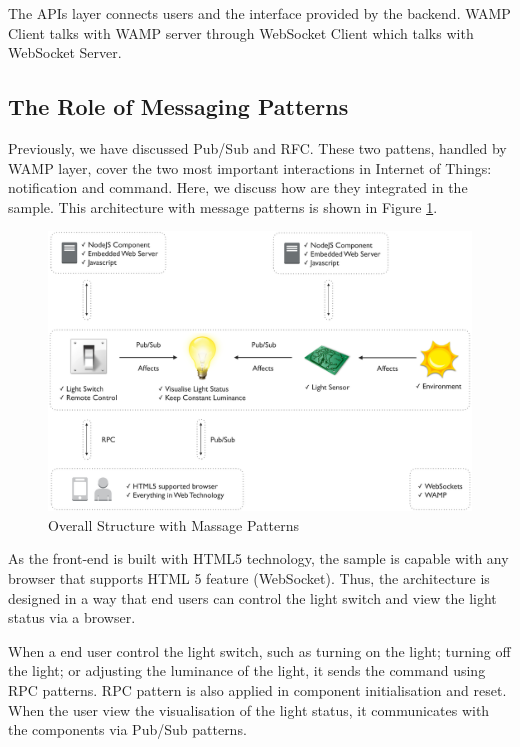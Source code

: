 The APIs layer connects users and the interface provided by the backend. WAMP Client talks with WAMP server through WebSocket Client which talks with WebSocket Server.

\subsection{The Role of Messaging Patterns}
Previously, we have discussed Pub/Sub and RFC. These two pattens, handled by WAMP layer, cover the two most important interactions in Internet of Things: notification and command. Here, we discuss how are they integrated in the sample. This architecture with message patterns is shown in Figure \ref{fig:message-pattern-overall-structure}.

\begin{figure}[t]
  \begin{center}
    \includegraphics[width=1\textwidth]{images/message-pattern-overall-structure.pdf}
    \caption{Overall Structure with Massage Patterns}
    \label{fig:message-pattern-overall-structure}
  \end{center}
\end{figure}

As the front-end is built with HTML5 technology, the sample is capable with any browser that supports HTML 5 feature (WebSocket). Thus, the architecture is designed in a way that end users can control the light switch and view the light status via a browser. 

When a end user control the light switch, such as turning on the light; turning off the light; or adjusting the luminance of the light, it sends the command using RPC patterns. RPC pattern is also applied in component initialisation and reset. When the user view the visualisation of the light status, it communicates with the components via Pub/Sub patterns.

